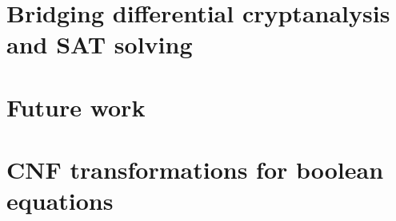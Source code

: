 \documentclass[fontsize=12pt,paper=A4,abstract=true]{scrreprt}
\begin{document}
\chapter{Bridging differential cryptanalysis and SAT solving}
\label{chap:implementation}


\chapter{Future work}
\label{chap:next}


\appendix
\chapter{CNF transformations for boolean equations}
\label{appendix:cnf}


\hypersetup{colorlinks=true,linktoc=all,linkcolor=contr}

\printbibliography
\listofalgorithms
\listoffigures
\listoftables
\printindex
\end{document}
